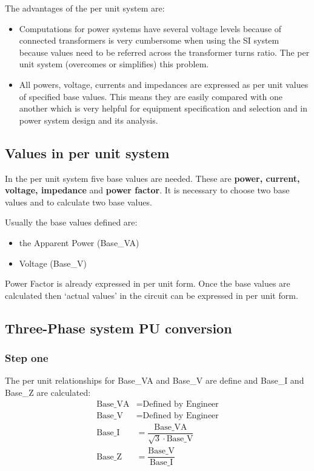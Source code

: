 \documentclass[class=report, crop=false, 12pt,a4paper]{standalone}
\begin{document}
The advantages of the per unit system are:
\begin{itemize}
	\item Computations for power systems have several voltage levels because of connected transformers is very cumbersome when using the SI system because values need to be referred across the transformer turns ratio. The per unit system (overcomes or simplifies) this problem.
	\item All powers, voltage, currents and impedances are expressed as per unit values of specified base values. This means they are easily compared with one another which is very helpful for equipment specification and selection and in power system design and its analysis.
\end{itemize}
\subsection{Values in per unit system}
In the per unit system five base values are needed. These are \textbf{power, current, voltage, impedance} and \textbf{power factor}. It is necessary to choose two base values and to calculate two base values.

Usually the base values defined are:
\begin{itemize}
	\item the Apparent Power (Base\_VA)
	\item Voltage (Base\_V)
\end{itemize}
Power Factor is already expressed in per unit form. Once the base values are calculated then `actual values' in the circuit can be expressed in per unit form.
\subsection{Three-Phase system PU conversion}
\subsubsection{Step one}
The per unit relationships for Base\_VA and Base\_V are define and Base\_I and Base\_Z are calculated:
\begin{align}
	\textrm{Base\_VA} &= \textrm{Defined by Engineer}\\
	\textrm{Base\_V} &= \textrm{Defined by Engineer}\\
	\textrm{Base\_I} &= \dfrac{\textrm{Base\_VA}}{\sqrt{3}\cdot \textrm{Base\_V}}\\
	\textrm{Base\_Z} &= \dfrac{\textrm{Base\_V}}{\textrm{Base\_I}}
\end{align}
\end{document}
